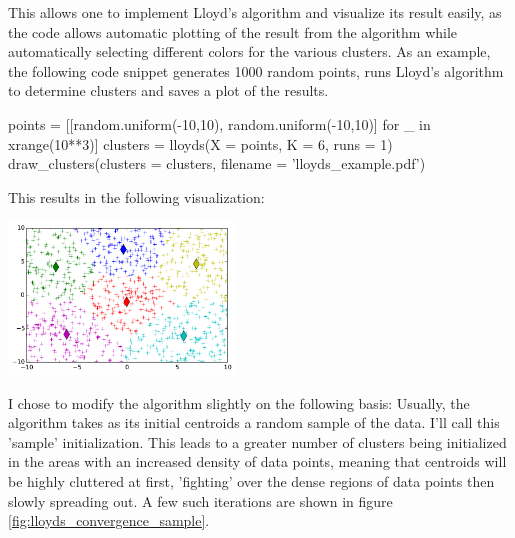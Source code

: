 This allows one to implement Lloyd's algorithm and visualize its result easily, as the code allows automatic plotting of the result from the algorithm while automatically selecting different colors for the various clusters. As an example, the following code snippet generates 1000 random points, runs Lloyd's algorithm to determine clusters and saves a plot of the results.
\begin{snippet}
	points = [[random.uniform(-10,10), random.uniform(-10,10)] for _ in xrange(10**3)]
	clusters = lloyds(X = points, K = 6, runs = 1)
	draw_clusters(clusters = clusters, filename = 'lloyds_example.pdf')
\end{snippet}
This results in the following visualization:
\begin{center}
	\includegraphics[width=0.45\textwidth]{pics/dtu/lloyds_example.pdf}
\end{center}
I chose to modify the algorithm slightly on the following basis: Usually, the algorithm takes as its initial centroids a random sample of the data. I'll call this 'sample' initialization. This leads to a greater number of clusters being initialized in the areas with an increased density of data points, meaning that centroids will be highly cluttered at first, 'fighting' over the dense regions of data points then slowly spreading out. A few such iterations are shown in figure \ref{fig:lloyds_convergence_sample}.
